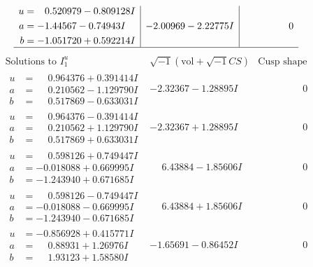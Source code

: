 \documentclass[1p]{elsarticle_modified}
\theoremstyle{definition}
\newcommand{\I}{\sqrt{-1}}
\begin{document}
$$\begin{array}{c|c|c}
\begin{aligned}
u &= \phantom{-}0.520979 - 0.809128 I \\
a &= -1.44567 - 0.74943 I \\
b &= -1.051720 + 0.592214 I\end{aligned}
 & -2.00969 - 2.22775 I & \phantom{-0.000000 } 0\\
 \hline 
 \end{array}$$\newpage$$\begin{array}{c|c|c}  
\text{Solutions to }I^u_{1}& \I (\text{vol} + \sqrt{-1}CS) & \text{Cusp shape}\\
 \hline 
\begin{aligned}
u &= \phantom{-}0.964376 + 0.391414 I \\
a &= \phantom{-}0.210562 - 1.129790 I \\
b &= \phantom{-}0.517869 - 0.633031 I\end{aligned}
 & -2.32367 - 1.28895 I & \phantom{-0.000000 } 0 \\ \hline\begin{aligned}
u &= \phantom{-}0.964376 - 0.391414 I \\
a &= \phantom{-}0.210562 + 1.129790 I \\
b &= \phantom{-}0.517869 + 0.633031 I\end{aligned}
 & -2.32367 + 1.28895 I & \phantom{-0.000000 } 0 \\ \hline\begin{aligned}
u &= \phantom{-}0.598126 + 0.749447 I \\
a &= -0.018088 + 0.669995 I \\
b &= -1.243940 + 0.671685 I\end{aligned}
 & \phantom{-}6.43884 - 1.85606 I & \phantom{-0.000000 } 0 \\ \hline\begin{aligned}
u &= \phantom{-}0.598126 - 0.749447 I \\
a &= -0.018088 - 0.669995 I \\
b &= -1.243940 - 0.671685 I\end{aligned}
 & \phantom{-}6.43884 + 1.85606 I & \phantom{-0.000000 } 0 \\ \hline\begin{aligned}
u &= -0.856928 + 0.415771 I \\
a &= \phantom{-}0.88931 + 1.26976 I \\
b &= \phantom{-}1.93123 + 1.58580 I\end{aligned}
 & -1.65691 - 0.86452 I & \phantom{-0.000000 } 0 \\ \hline\begin{aligned}

\end{aligned}
\end{array}$$
\end{document}
